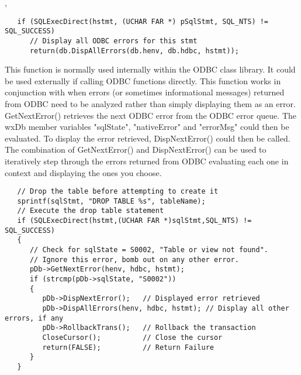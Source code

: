 
, 

\begin{verbatim}
   if (SQLExecDirect(hstmt, (UCHAR FAR *) pSqlStmt, SQL_NTS) != SQL_SUCCESS)
      // Display all ODBC errors for this stmt
      return(db.DispAllErrors(db.henv, db.hdbc, hstmt));
\end{verbatim}


\label{wxdbdispnexterror}



This function is normally used internally within the ODBC class library.
It could be used externally if calling ODBC functions directly.  This
function works in conjunction with  when errors (or
sometimes informational messages)  returned from ODBC need to be analyzed
rather than simply displaying them as an error.  GetNextError() retrieves
the next ODBC error from the ODBC error queue.  The wxDb member variables
"sqlState", "nativeError" and "errorMsg" could then be evaluated.  To
display the error retrieved, DispNextError() could then be called.
The combination of GetNextError() and DispNextError() can be used to
iteratively step through the errors returned from ODBC evaluating each
one in context and displaying the ones you choose.

\begin{verbatim}
   // Drop the table before attempting to create it
   sprintf(sqlStmt, "DROP TABLE %s", tableName);
   // Execute the drop table statement
   if (SQLExecDirect(hstmt,(UCHAR FAR *)sqlStmt,SQL_NTS) != SQL_SUCCESS)
   {
      // Check for sqlState = S0002, "Table or view not found".
      // Ignore this error, bomb out on any other error.
      pDb->GetNextError(henv, hdbc, hstmt);
      if (strcmp(pDb->sqlState, "S0002"))
      {
         pDb->DispNextError();   // Displayed error retrieved
         pDb->DispAllErrors(henv, hdbc, hstmt); // Display all other errors, if any
         pDb->RollbackTrans();   // Rollback the transaction
         CloseCursor();          // Close the cursor
         return(FALSE);          // Return Failure
      }
   }
\end{verbatim}


\label{wxdbdropview}

